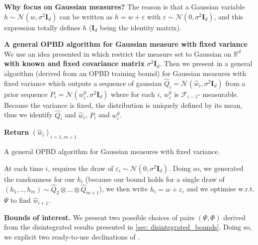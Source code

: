 \textbf{Why focus on Gaussian measures?} The reason is that a Gaussian variable $h\sim\mathcal{N}(w,\sigma^2\mathbf{I}_d)$ can be written as $h=w +\varepsilon$ with $\varepsilon\sim\mathcal{N}(0,\sigma^2\mathbf{I}_d)$, and this expression totally defines $h$ ($\mathbf{I}_d$ being the identity matrix).

\textbf{A general OPBD algorithm for Gaussian measure with fixed variance} We use an idea presented in \citet{viallard2023general} which restrict the measure set to Gaussian on $\mathbb{R}^d$ \textbf{with known and fixed covariance matrix} $\sigma^2 \mathbf{I}_d$.
Then we present in  a general algorithm (derived from an OPBD training bound) for Gaussian measures with fixed variance which outputs a sequence of gaussian $\hat{Q}_i=\mathcal{N}(\hat{w}_i,\sigma^2\mathbf{I}_d)$ from a prior sequence $P_i= \mathcal{N}(w_i^0,\sigma^2\mathbf{I}_d)$
where for each $i$, $w_i^0$ is $\mathcal{F}_{i-1}$- measurable. Because the variance is fixed, the distribution is uniquely defined by its mean, thus we identify $\hat{Q}_i$ and $\hat{w}_i$, $P_i$ and $w_i^0$.

\begin{algorithm}[ht]
 \SetAlgoLined
\textbf{Return} $(\hat{w}_i)_{i=1..m+1}$
 \caption{A general OPBD algorithm for Gaussian measures with fixed variance.}
 \label{alg: OPBD_alg}
 \end{algorithm}

At each time $i$,  requires the draw of $\varepsilon_i\sim\mathcal{N}(0,\sigma^2 \mathbf{I}_d)$. Doing so, we generated the randomness for our $h_i$ (because our bound holds for a single draw of $(h_1,..,h_m)\sim \hat{Q}_2\otimes...\otimes \hat{Q}_{m+1}$), we then write $h_i= w + \varepsilon_i$
and we optimise w.r.t. $\Psi$ to find $\hat{w}_{i+1}$.

\textbf{Bounds of interest.} We present two possible choices of pairs $(\Psi,\Phi)$ derived from the disintegrated results presented in \cref{sec: disintegrated_bounds}. Doing so, we explicit two ready-to-use declinations of .

